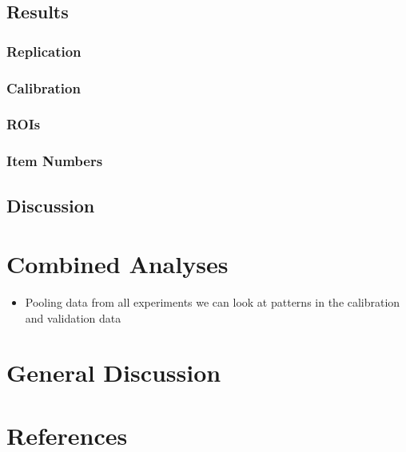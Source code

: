\documentclass[
  english,
  man,floatsintext]{apa6}
\providecommand{\tightlist}{%
  \setlength{\itemsep}{0pt}\setlength{\parskip}{0pt}}
\begin{document}
\hypertarget{results-5}{%
\subsection{Results}\label{results-5}}

\hypertarget{replication-3}{%
\subsubsection{Replication}\label{replication-3}}

\hypertarget{calibration-3}{%
\subsubsection{Calibration}\label{calibration-3}}

\hypertarget{rois}{%
\subsubsection{ROIs}\label{rois}}

\hypertarget{item-numbers}{%
\subsubsection{Item Numbers}\label{item-numbers}}

\hypertarget{discussion-5}{%
\subsection{Discussion}\label{discussion-5}}

\hypertarget{combined-analyses}{%
\section{Combined Analyses}\label{combined-analyses}}

\begin{itemize}
\tightlist
\item
  Pooling data from all experiments we can look at patterns in the calibration and validation data
\end{itemize}

\hypertarget{general-discussion}{%
\section{General Discussion}\label{general-discussion}}

\newpage

\hypertarget{references}{%
\section{References}\label{references}}
\end{document}
